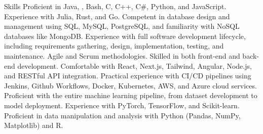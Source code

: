 
\begin{rubric}{Skills}
    Proficient in Java, , Bash, C, C++, C\#, Python, and JavaScript. Experience with Julia, Rust, and Go.
    Competent in database design and management using SQL, MySQL, PostgreSQL, and familiarity with NoSQL databases like MongoDB.
    Experience with full software development lifecycle, including requirements gathering, design, implementation, testing, and maintenance. Agile and Scrum methodologies.
    Skilled in both front-end and back-end development. Comfortable with React, Next.js, Tailwind, Angular, Node.js, and RESTful API integration.
    Practical experience with CI/CD pipelines using Jenkins, Github Workflows, Docker, Kubernetes, AWS, and Azure cloud services.
    Proficient with the entire machine learning pipeline, from dataset development to model deployment. Experience with PyTorch, TensorFlow, and Scikit-learn.
    Proficient in data manipulation and analysis with Python (Pandas, NumPy, Matplotlib) and R.
\end{rubric}
